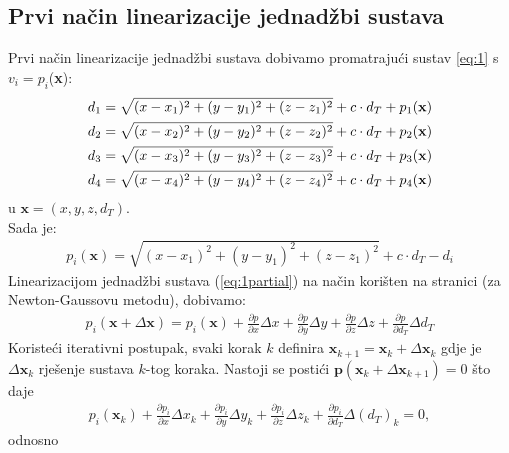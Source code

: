 \documentclass[a4paper,twoside,12pt]{memoir} %
\begin{document}
\subsection{Prvi način linearizacije jednadžbi sustava}
Prvi način linearizacije jednadžbi sustava dobivamo promatrajući sustav \ref{eq:1} s $v_i = p_i$(\textbf{x}):
\begin{align}\label{eq:1partial}
d_1 = \sqrt{(x-x_1)^{2}+(y-y_1)^{2}+(z-z_1)^{2}} + c\cdot d_T + p_1(\mathbf{x})\notag \\
d_2 = \sqrt{(x-x_2)^{2}+(y-y_2)^{2}+(z-z_2)^{2}} + c\cdot d_T + p_2(\mathbf{x})\\
d_3 = \sqrt{(x-x_3)^{2}+(y-y_3)^{2}+(z-z_3)^{2}} + c\cdot d_T + p_3(\mathbf{x}) \notag \\
d_4 = \sqrt{(x-x_4)^{2}+(y-y_4)^{2}+(z-z_4)^{2}} + c\cdot d_T + p_4(\mathbf{x}) \notag
\end{align}
u $\mathbf{x} = (x,y,z,d_T)$.\\
Sada je:
\begin{align}
p_i(\mathbf{x}) = \sqrt{(x-x_1)^{2}+(y-y_1)^{2}+(z-z_1)^{2}} + c\cdot d_T- d_i
\end{align}
Linearizacijom jednadžbi sustava (\ref{eq:1partial}) na način korišten na stranici \pageref{stranica:NGLin} (za Newton-Gaussovu metodu), dobivamo:
\begin{align}
p_i(\mathbf{x} + \Delta\mathbf{x}) = p_i(\mathbf{x}) + \frac{\partial p}{\partial x}\Delta x + \frac{\partial p}{\partial y}\Delta y + \frac{\partial p}{\partial z}\Delta z + \frac{\partial p}{\partial d_T}\Delta d_T 
\end{align}
Koristeći iterativni postupak, svaki korak $k$ definira $\mathbf{x}_{k+1} = \mathbf{x}_k+\Delta\mathbf{x}_k$
gdje je $\Delta \mathbf{x}_{k}$ rješenje sustava $k$-tog koraka. Nastoji se postići $\mathbf{p}(\mathbf{x}_k+\Delta\mathbf{x}_{k+1}) = 0$
što daje
\begin{align}
p_i(\mathbf{x}_{k}) + \frac{\partial p_i}{\partial x}\Delta x_k + \frac{\partial p_i}{\partial y}\Delta y_k + \frac{\partial p_i}{\partial z}\Delta z_k + \frac{\partial p_i}{\partial d_T}\Delta (d_T)_k = 0,
\end{align}
odnosno
\end{document}
